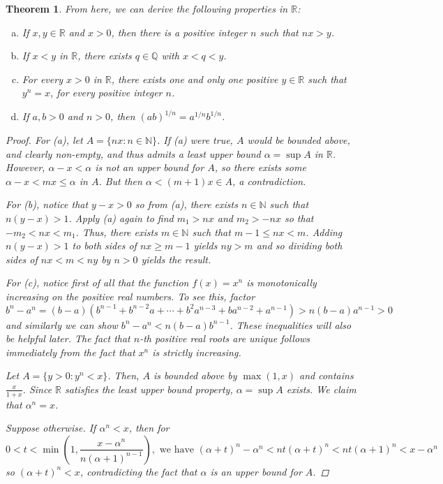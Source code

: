 \documentclass{scrbook}
\newcommand{\N}{\mathbb{N}}
\newcommand{\Q}{\mathbb{Q}}
\newcommand{\R}{\mathbb{R}}
\newtheorem{theorem}{Theorem}
\begin{document}
\begin{theorem}
From here, we can derive the following properties in $\R$:
\begin{enumerate}[(a)]
\item If $x, y \in \R$ and $x > 0$, then there is a positive integer $n$ such that $nx > y$. 
\item If $x < y$ in $\R$, there exists $q \in \Q$ with $x < q < y$.
\item For every $x > 0$ in $\R$, there exists one and only one positive $y \in \R$ such that $y^n = x$, for every positive integer $n$.
\item If $a, b > 0$ and $n > 0$, then $(ab)^{1/n} = a^{1/n} b^{1/n}$.
\end{enumerate}
\begin{proof}
For (a), let $A = \{nx: n \in \N\}$. If (a) were true, $A$ would be bounded above, and clearly non-empty, and thus admits a least upper bound $\alpha = \sup A$ in $\R$. However, $\alpha - x < \alpha$ is not an upper bound for $A$, so there exists some $\alpha - x < mx \le \alpha$ in $A$. But then $\alpha < (m + 1)x \in A$, a contradiction.

For (b), notice that $y - x > 0$ so from (a), there exists $n \in \N$ such that $n(y - x) > 1$. Apply (a) again to find $m_1 > nx$ and $m_2 > -nx$ so that $-m_2 < nx < m_1$. Thus, there exists $m \in \N$ such that $m - 1 \le nx < m$. Adding $n(y - x) > 1$ to both sides of $nx \ge m - 1$ yields $ny > m$ and so dividing both sides of $nx < m < ny$ by $n > 0$ yields the result.

For (c), notice first of all that the function $f(x) = x^n$ is monotonically increasing on the positive real numbers. To see this, factor
\[
	b^n - a^n = (b - a)(b^{n-1} + b^{n-2}a + \dotsb + b^2 a^{n-3} + ba^{n-2} + a^{n-1}) > n(b-a)a^{n-1} > 0
\]
and similarly we can show $b^n - a^n < n(b-a)b^{n-1}$. These inequalities will also be helpful later. The fact that $n$-th positive real roots are unique follows immediately from the fact that $x^n$ is strictly increasing. 

Let $A = \{y > 0: y^n < x\}$. Then, $A$ is bounded above by $\max(1, x)$ and contains $\frac{x}{1+x}$. Since $\R$ satisfies the least upper bound property, $\alpha = \sup A$ exists. We claim that $\alpha^n = x$. 

Suppose otherwise. If $\alpha^n < x$, then for
\[
	0 < t < \min\left(1, \frac{x-\alpha^n}{n(\alpha + 1)^{n-1}}\right), \text{ we have }(\alpha + t)^n - \alpha^n < nt(\alpha + t)^n < nt(\alpha + 1)^n < x - \alpha^n
\]
so $(\alpha + t)^n < x$, contradicting the fact that $\alpha$ is an upper bound for $A$. 


\end{proof}
\end{theorem}
\end{document}
